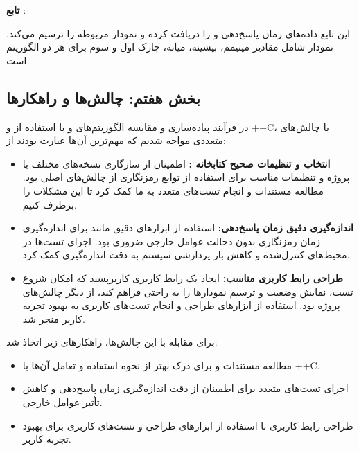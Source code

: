 \documentclass{report}
\begin{document}
\textbf{تابع }:

این تابع داده‌های زمان پاسخ‌دهی  و  را دریافت کرده و نمودار  مربوطه را ترسیم می‌کند. نمودار شامل مقادیر مینیمم، بیشینه، میانه، چارک اول و سوم برای هر دو الگوریتم است.

\subsection*{بخش هفتم: چالش‌ها و راهکارها}
در فرآیند پیاده‌سازی و مقایسه الگوریتم‌های  و  با استفاده از  و ++C، با چالش‌های متعددی مواجه شدیم که مهم‌ترین آن‌ها عبارت بودند از:

\begin{itemize}
    \item \textbf{انتخاب و تنظیمات صحیح کتابخانه :} اطمینان از سازگاری نسخه‌های مختلف  با پروژه و تنظیمات مناسب برای استفاده از توابع رمزنگاری از چالش‌های اصلی بود. مطالعه مستندات  و انجام تست‌های متعدد به ما کمک کرد تا این مشکلات را برطرف کنیم.
    
    
    \item \textbf{اندازه‌گیری دقیق زمان پاسخ‌دهی:} استفاده از ابزارهای دقیق مانند  برای اندازه‌گیری زمان رمزنگاری بدون دخالت عوامل خارجی ضروری بود. اجرای تست‌ها در محیط‌های کنترل‌شده و کاهش بار پردازشی سیستم به دقت اندازه‌گیری کمک کرد.
    
    \item \textbf{طراحی رابط کاربری مناسب:} ایجاد یک رابط کاربری کاربرپسند که امکان شروع تست، نمایش وضعیت و ترسیم نمودارها را به راحتی فراهم کند، از دیگر چالش‌های پروژه بود. استفاده از ابزارهای طراحی  و انجام تست‌های کاربری به بهبود تجربه کاربر منجر شد.
\end{itemize}

برای مقابله با این چالش‌ها، راهکارهای زیر اتخاذ شد:

\begin{itemize}
    \item مطالعه مستندات  و  برای درک بهتر از نحوه استفاده و تعامل آن‌ها با ++C.
    
    \item اجرای تست‌های متعدد برای اطمینان از دقت اندازه‌گیری زمان پاسخ‌دهی و کاهش تأثیر عوامل خارجی.
    
    \item طراحی رابط کاربری با استفاده از ابزارهای طراحی  و تست‌های کاربری برای بهبود تجربه کاربر.
\end{itemize}
\end{document}
